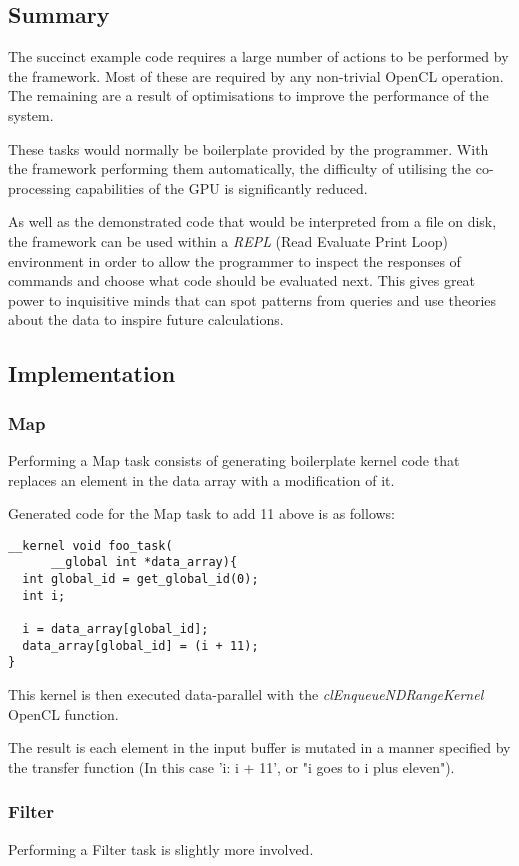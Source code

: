   \subsection{Summary}

  The succinct example code requires a large number of actions to be performed by the framework. Most of these are required by any non-trivial OpenCL operation. The remaining are a result of optimisations to improve the performance of the system.

  These tasks would normally be boilerplate provided by the programmer. With the framework performing them automatically, the difficulty of utilising the co-processing capabilities of the GPU is significantly reduced.

  As well as the demonstrated code that would be interpreted from a file on disk, the framework can be used within a \emph{REPL} (Read Evaluate Print Loop) environment in order to allow the programmer to inspect the responses of commands and choose what code should be evaluated next. This gives great power to inquisitive minds that can spot patterns from queries and use theories about the data to inspire future calculations.

  \subsection{Implementation}
  \subsubsection{Map}
    Performing a Map task consists of generating boilerplate kernel code that replaces an element in the data array with a modification of it.

    Generated code for the Map task to add 11 above is as follows:
    \begin{verbatim}
__kernel void foo_task(
      __global int *data_array){
  int global_id = get_global_id(0);
  int i;

  i = data_array[global_id];
  data_array[global_id] = (i + 11);
}
    \end{verbatim}
    This kernel is then executed data-parallel with the \emph{clEnqueueNDRangeKernel} OpenCL function.

    The result is each element in the input buffer is mutated in a manner specified by the transfer function (In this case 'i: i + 11', or "i goes to i plus eleven").

  \subsubsection{Filter}
    Performing a Filter task is slightly more involved.

